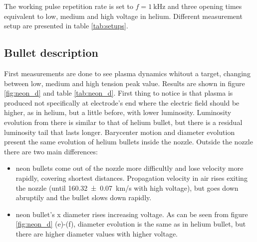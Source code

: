 The working pulse repetition rate is set to $f = \SI{1}{\kilo\hertz}$ and three opening times equivalent to low, medium and high voltage in helium. Different measurement setup are presented in table \ref{tab:setups}.

\subsection{Bullet description}
First measurements are done to see plasma dynamics whitout a target, changing between low, medium and high tension peak value. Results are shown in figure \ref{fig:neon_d} and table \ref{tab:neon_d}.
First thing to notice is that plasma is produced not specifically at electrode's end where the electric field should be higher, as in helium, but a little before, with lower luminosity. Luminosity evolution from there is similar to that of helium bullet, but there is a residual luminosity tail that lasts longer.
Barycenter motion and diameter evolution present the same evolution of helium bullets inside the nozzle. Outside the nozzle there are two main differences:
\begin{itemize}
 \item neon bullets come out of the nozzle more difficultly and lose velocity more rapidly, covering shortest distances. Propagation velocity in air rises exiting the nozzle (until \SI{160.32(7)}{\kilo\meter/\second} with high voltage), but goes down abruptily and the bullet slows down rapidly.
 \item neon bullet's x diameter rises increasing voltage. As can be seen from figure \ref{fig:neon_d} (e)-(f), diameter evolution is the same as in helium bullet, but there are higher diameter values with higher voltage.
\end{itemize}

